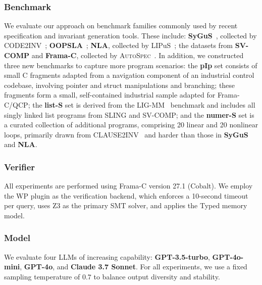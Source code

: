 \documentclass[lettersize,journal]{IEEEtran}
\def\revcolor{blue}
\DeclareRobustCommand{\rev}[1]{{\color{\revcolor}#1}}
\newcommand{\autospec}{\textsc{AutoSpec}}
\begin{document}
\subsubsection*{Benchmark}
We evaluate our approach on benchmark families commonly used by recent specification and invariant generation tools. These include:  \textbf{SyGuS}~\cite{alur2019sygus}, collected by CODE2INV~\cite{Code2Inv_a_Deep_Learning_Framework_for_Program_Verification}; \textbf{OOPSLA}~\cite{Inductive_Invariant_Generation_via_Abductive_Inference}; \textbf{NLA}, collected by LIPuS~\cite{Loop_Invariant_Inference_through_SMT_Solving_Enhanced_Reinforcement_Learning}; the datasets from \textbf{SV-COMP} and \textbf{Frama-C}, collected by \autospec~\cite{autospec}.
In addition, we constructed three new benchmarks to capture more program scenarios: the \textbf{pIp} set consists of small C fragments adapted from a navigation component of an industrial control codebase, involving pointer and struct manipulations and branching; \rev{these fragments form a small, self-contained industrial sample adapted for Frama-C/QCP};
the \textbf{list-S} set is derived from the LIG-MM~\cite{LIG-MM} benchmark and includes all singly linked list programs from SLING and SV-COMP; and the \textbf{numer-S} set is a curated collection of additional programs, comprising 20 linear and 20 nonlinear loops, primarily drawn from CLAUSE2INV~\cite{DBLP:journals/pacmse/CaoWXYWCM25} and harder than those in \textbf{SyGuS} and \textbf{NLA}.



\subsubsection*{Verifier}

All experiments are performed using Frama-C version 27.1 (Cobalt). We employ the WP plugin as the verification backend, which enforces a 10-second timeout per query, uses Z3 as the primary SMT solver, and applies the Typed memory model.  

\subsubsection*{Model}
We evaluate four LLMs of increasing capability: \textbf{GPT-3.5-turbo}, \textbf{GPT-4o-mini}, \textbf{GPT-4o}, and \textbf{Claude 3.7 Sonnet}. For all experiments, we use a fixed sampling temperature of $0.7$ to balance output diversity and stability.
\end{document}
